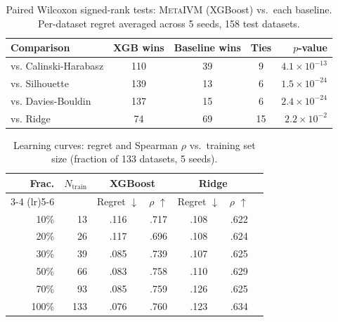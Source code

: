\documentclass[10pt]{article} %
\newcommand{\ours}{\textsc{MetaIVM}}
\begin{document}
\begin{table}[h]
\centering
\caption{Paired Wilcoxon signed-rank tests: \ours{} (XGBoost) vs.\ each baseline. Per-dataset regret averaged across 5 seeds, 158 test datasets.}
\label{tab:significance}
\small
\begin{tabular}{lcccr}
\toprule
\textbf{Comparison} & \textbf{XGB wins} & \textbf{Baseline wins} & \textbf{Ties} & \textbf{$p$-value} \\
\midrule
vs. Calinski-Harabasz & 110 & 39 & 9 & $4.1 \times 10^{-13}$ \\
vs. Silhouette & 139 & 13 & 6 & $1.5 \times 10^{-24}$ \\
vs. Davies-Bouldin & 137 & 15 & 6 & $2.4 \times 10^{-24}$ \\
vs. Ridge & 74 & 69 & 15 & $2.2 \times 10^{-2}$ \\
\bottomrule
\end{tabular}
\end{table}

\begin{table}[h]
\centering
\caption{Learning curves: regret and Spearman $\rho$ vs.\ training set size (fraction of 133 datasets, 5 seeds).}
\label{tab:learning}
\small
\begin{tabular}{rrccccc}
\toprule
\textbf{Frac.} & $N_{\text{train}}$ & \multicolumn{2}{c}{\textbf{XGBoost}} & \multicolumn{2}{c}{\textbf{Ridge}} \\
\cmidrule(lr){3-4} \cmidrule(lr){5-6}
& & Regret $\downarrow$ & $\rho$ $\uparrow$ & Regret $\downarrow$ & $\rho$ $\uparrow$ \\
\midrule
10\% & 13 & .116 & .717 & .108 & .622 \\
20\% & 26 & .117 & .696 & .108 & .624 \\
30\% & 39 & .085 & .739 & .107 & .625 \\
50\% & 66 & .083 & .758 & .110 & .629 \\
70\% & 93 & .085 & .759 & .126 & .625 \\
100\% & 133 & .076 & .760 & .123 & .634 \\
\bottomrule
\end{tabular}
\end{table}
\end{document}
